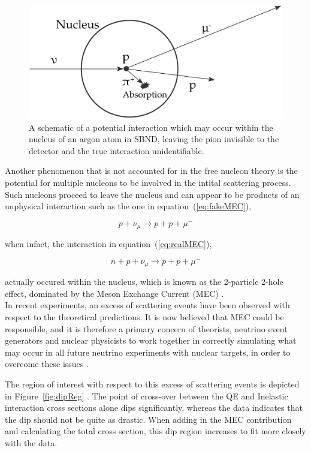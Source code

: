     \begin{figure}[h!]
        \centering
        \includegraphics[width=.6\textwidth]{images/inter_nuc.pdf}
        \caption{A schematic of a potential interaction which may occur within the nucleus of an argon atom in SBND, leaving the pion invisible to the detector and the true interaction unidentifiable.}
        \label{fig:interNuc}
    \end{figure}

Another phenomenon that is not accounted for in the free nucleon theory is the potential for multiple nucleons to be involved in the intital scattering process. Such nucleons proceed to leave the nucleus and can appear to be products of an unphysical interaction such as the one in equation~(\ref{eq:fakeMEC}),

    \begin{equation}\label{eq:fakeMEC}
        p + \nu_{\mu} \longrightarrow p + p + \mu^{-}
    \end{equation}

    when infact, the interaction in equation~(\ref{eq:realMEC}),
    
    \begin{equation}\label{eq:realMEC}
        n + p + \nu_{\mu} \longrightarrow p + p + \mu^{-}
    \end{equation}

    actually occured within the nucleus, which is known as the 2-particle 2-hole effect, dominated by the Meson Exchange Current (MEC) \cite{MEC}.      \\

    In recent experiments, an excess of scattering events have been observed with respect to the theoretical predictions. It is now believed that MEC could be responsible, and it is therefore a primary concern of theorists, neutrino event generators and nuclear physicists to work together in correctly simulating what may occur in all future neutrino experiments with nuclear targets, in order to overcome these issues \cite{MEC}.

    The region of interest with respect to this excess of scattering events is depicted in Figure~\ref{fig:dipReg} \cite{dipReg}. The point of cross-over between the QE and Inelastic interaction cross sections alone dips significantly, whereas the data indicates that the dip should not be quite as drastic. When adding in the MEC contribution and calculating the total cross section, this dip region increases to fit more closely with the data.  

